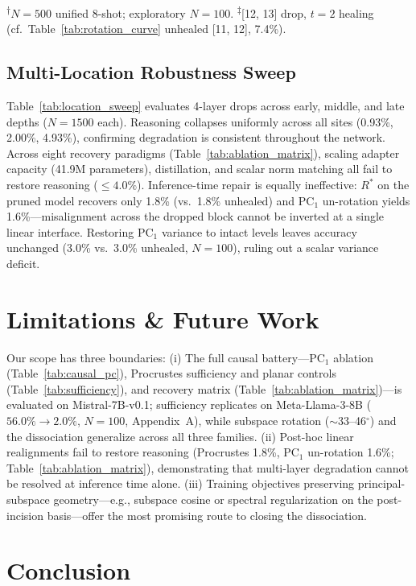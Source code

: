 \documentclass[pmlr,onecolumn]{jmlr}
\begin{document}
\noindent\textsuperscript{$\dagger$}$N{=}500$ unified 8-shot; exploratory $N{=}100$. \textsuperscript{$\ddagger$}[12, 13] drop, $t{=}2$ healing (cf.\ Table~\ref{tab:rotation_curve} unhealed [11, 12], 7.4\%).

\subsection{Multi-Location Robustness Sweep}

Table~\ref{tab:location_sweep} evaluates 4-layer drops across early, middle, and late depths ($N=1500$ each). Reasoning collapses uniformly across all sites (0.93\%, 2.00\%, 4.93\%), confirming degradation is consistent throughout the network. Across eight recovery paradigms (Table~\ref{tab:ablation_matrix}), scaling adapter capacity (41.9M parameters), distillation, and scalar norm matching all fail to restore reasoning ($\le 4.0\%$). Inference-time repair is equally ineffective: $R^*$ on the pruned model recovers only 1.8\% (vs.\ 1.8\% unhealed) and $\mathrm{PC}_1$ un-rotation yields 1.6\%---misalignment across the dropped block cannot be inverted at a single linear interface. Restoring $\mathrm{PC}_1$ variance to intact levels leaves accuracy unchanged (3.0\% vs.\ 3.0\% unhealed, $N=100$), ruling out a scalar variance deficit.

\section{Limitations \& Future Work}

Our scope has three boundaries: (i) The full causal battery---$\mathrm{PC}_1$ ablation (Table~\ref{tab:causal_pc}), Procrustes sufficiency and planar controls (Table~\ref{tab:sufficiency}), and recovery matrix (Table~\ref{tab:ablation_matrix})---is evaluated on Mistral-7B-v0.1; sufficiency replicates on Meta-Llama-3-8B ($56.0\% \to 2.0\%$, $N=100$, Appendix~A), while subspace rotation ($\sim$33--46$^\circ$) and the dissociation generalize across all three families. (ii) Post-hoc linear realignments fail to restore reasoning (Procrustes 1.8\%, $\mathrm{PC}_1$ un-rotation 1.6\%; Table~\ref{tab:ablation_matrix}), demonstrating that multi-layer degradation cannot be resolved at inference time alone. (iii) Training objectives preserving principal-subspace geometry---e.g., subspace cosine or spectral regularization on the post-incision basis---offer the most promising route to closing the dissociation.

\section{Conclusion}
\end{document}
